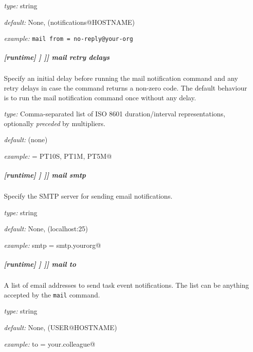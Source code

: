 \begin{myitemize}
    \item {\em type:} string
    \item {\em default:} None, (notifications@HOSTNAME)
    \item {\em example:} \lstinline|mail from = no-reply@your-org|
\end{myitemize}

\subparagraph[mail retry delays]{[runtime] \textrightarrow [[\_\_NAME\_\_]] \textrightarrow [[[events]]] \textrightarrow mail retry delays}

Specify an initial delay before running the mail notification command and any
retry delays in case the command returns a non-zero code. The default behaviour
is to run the mail notification command once without any delay.

\begin{myitemize}
    \item {\em type:} Comma-separated list of ISO 8601 duration/interval representations, optionally {\em preceded} by multipliers.
    \item {\em default:} (none)
    \item {\em example:} \lstinline@handler = PT10S, PT1M, PT5M@
\end{myitemize}

\subparagraph[mail smtp]{[runtime] \textrightarrow [[\_\_NAME\_\_]] \textrightarrow [[[events]]] \textrightarrow mail smtp}

Specify the SMTP server for sending email notifications.

\begin{myitemize}
    \item {\em type:} string
    \item {\em default:} None, (localhost:25)
    \item {\em example:} \lstinline@mail smtp = smtp.yourorg@
\end{myitemize}

\subparagraph[mail to]{[runtime] \textrightarrow [[\_\_NAME\_\_]] \textrightarrow [[[events]]] \textrightarrow mail to}

A list of email addresses to send task event notifications. The list can be
anything accepted by the \lstinline=mail= command.

\begin{myitemize}
    \item {\em type:} string
    \item {\em default:} None, (USER@HOSTNAME)
    \item {\em example:} \lstinline@mail to = your.colleague@
\end{myitemize}

